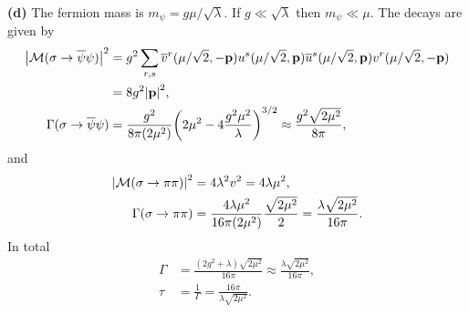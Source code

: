 \documentclass{article}
\makeatletter
\newcommand*{\shifttext}[1]{%
  \settowidth{\@tempdima}{#1}%
  \hspace{-\@tempdima}#1%
}
\newcommand{\plabel}[1]{%
\shifttext{\textbf{#1}\quad}%
}
\makeatother
\begin{document}
\plabel{(d)}%
The fermion mass is $m_\psi = g\mu/\sqrt{\lambda}$.
If $g\ll \sqrt{\lambda}$ then $m_\psi\ll \mu$.
The decays are given by
\begin{align*}
  \abs{\mathcal{M}(\sigma \rightarrow \overline{\psi}\psi)}^2 &= g^2 \sum_{r,s} \overline{v}^r(\mu/\sqrt{2},-\vb{p}) u^s(\mu/\sqrt{2},\vb{p})\overline{u}^s(\mu/\sqrt{2},\vb{p}) v^r(\mu/\sqrt{2},-\vb{p}) \\
  &= 8g^2 \abs{\vb{p}}^2, \\
  \Gamma(\sigma \rightarrow \overline{\psi}\psi) &= \frac{g^2}{8\pi (2\mu^2)}\qty(2\mu^2 - 4\frac{g^2 \mu^2}{\lambda})^{3/2} \approx \frac{g^2 \sqrt{2\mu^2}}{8\pi},
\end{align*}
and
\begin{align*}
  \abs{\mathcal{M}(\sigma \rightarrow \pi\pi)}^2 &= 4\lambda^2 v^2 = 4\lambda \mu^2, \\
  \Gamma(\sigma \rightarrow \pi\pi) &= \frac{4\lambda \mu^2}{16\pi (2\mu^2)} \frac{\sqrt{2\mu^2}}{2} = \frac{\lambda \sqrt{2\mu^2}}{16\pi}.
\end{align*}
In total
\begin{align*}
  \Gamma &= \frac{(2g^2 + \lambda)\sqrt{2\mu^2}}{16\pi} \approx \frac{\lambda \sqrt{2\mu^2}}{16\pi}, \\
  \tau &= \frac{1}{\Gamma} = \frac{16\pi}{\lambda\sqrt{2\mu^2}}.
\end{align*}
\end{document}
